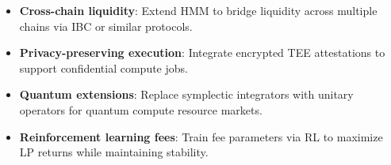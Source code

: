 \begin{itemize}[leftmargin=1.1em]
    \item \textbf{Cross-chain liquidity}: Extend HMM to bridge liquidity across multiple chains via IBC or similar protocols.
    \item \textbf{Privacy-preserving execution}: Integrate encrypted TEE attestations to support confidential compute jobs.
    \item \textbf{Quantum extensions}: Replace symplectic integrators with unitary operators for quantum compute resource markets.
    \item \textbf{Reinforcement learning fees}: Train fee parameters via RL to maximize LP returns while maintaining stability.
\end{itemize}

